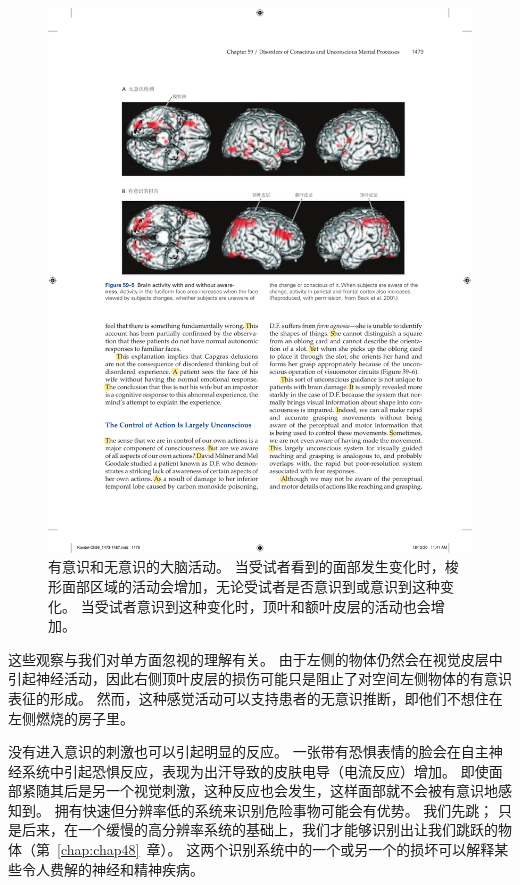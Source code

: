 \begin{figure}[htbp]
	\centering
	\includegraphics[width=0.98\linewidth]{chap59/fig_59_5}
	\caption{有意识和无意识的大脑活动。
		当受试者看到的面部发生变化时，梭形面部区域的活动会增加，无论受试者是否意识到或意识到这种变化。
		当受试者意识到这种变化时，顶叶和额叶皮层的活动也会增加\cite{beck2001neural}。}
	\label{fig:59_5}
\end{figure}


这些观察与我们对单方面忽视的理解有关。
由于左侧的物体仍然会在视觉皮层中引起神经活动，因此右侧顶叶皮层的损伤可能只是阻止了对空间左侧物体的有意识表征的形成。
然而，这种感觉活动可以支持患者的无意识推断，即他们不想住在左侧燃烧的房子里。


没有进入意识的刺激也可以引起明显的反应。
一张带有恐惧表情的脸会在自主神经系统中引起恐惧反应，表现为出汗导致的皮肤电导（电流反应）增加。
即使面部紧随其后是另一个视觉刺激，这种反应也会发生，这样面部就不会被有意识地感知到。
拥有快速但分辨率低的系统来识别危险事物可能会有优势。
我们先跳；
只是后来，在一个缓慢的高分辨率系统的基础上，我们才能够识别出让我们跳跃的物体（第~\ref{chap:chap48}~章）。
这两个识别系统中的一个或另一个的损坏可以解释某些令人费解的神经和精神疾病。


